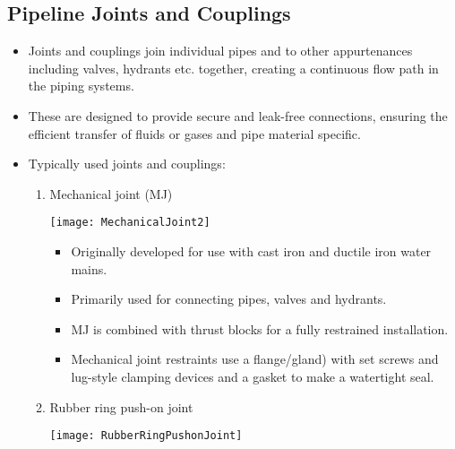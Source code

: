 \subsection{Pipeline Joints and Couplings}  
\begin{itemize}
\item Joints and couplings join individual pipes and to other appurtenances including valves, hydrants etc. together, creating a continuous flow path in the piping systems. 
\item These are designed to provide secure and leak-free connections, ensuring the efficient transfer of fluids or gases and pipe material specific.
\item Typically used joints and couplings:
\begin{enumerate}
\item Mechanical joint (MJ) \\
\begin{minipage}{0.3\textwidth}
\texttt{[image: MechanicalJoint2]}
\end{minipage}
\begin{minipage}{0.1\textwidth}
\end{minipage}
\begin{minipage}{0.55\textwidth}
\begin{itemize}
\item Originally developed for use with cast iron and ductile iron water mains.
\item Primarily used for connecting pipes, valves and hydrants.
\item MJ is combined with thrust blocks for a fully restrained installation.
\item Mechanical joint restraints use a flange/gland) with set screws and lug-style clamping devices and a gasket to make a watertight seal.
\end{itemize}
\end{minipage}
\vspace{0.3cm}
\item Rubber ring push-on joint \\
\begin{minipage}{0.3\textwidth}
\texttt{[image: RubberRingPushonJoint]}
\end{minipage}
\begin{minipage}{0.1\textwidth}
\end{minipage}
\begin{minipage}{0.55\textwidth}

\end{minipage}
\end{enumerate}
\end{itemize}
